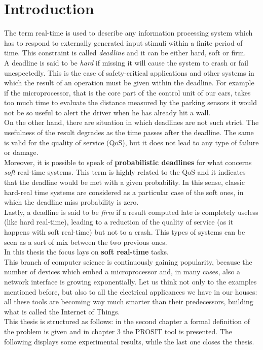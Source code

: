 \chapter{Introduction}\label{chp:introduction}


The term real-time is used to describe any information processing system which has to respond to externally generated input stimuli within a finite period of time. This constraint is called \emph{deadline} and it can be either hard, soft or firm.\\
A deadline is said to be \emph{hard} if missing it will cause the system to crash or fail unespectedly. This is the case of safety-critical applications and other systems in which the result of an operation must be given within the deadline. For example if the microprocessor, that is the core part of the control unit of our cars, takes too much time to evaluate the distance measured by the parking sensors it would not be so useful to alert the driver when he has already hit a wall.\\
On the other hand, there are situation in which deadlines are not such strict. The usefulness of the result degrades as the time passes after the deadline. The same is valid for the quality of service (QoS), but it does not lead to any type of failure or damage.\\
Moreover, it is possible to speak of \textbf{probabilistic deadlines} for what concerns \emph{soft} real-time systems. This term is highly related to the QoS and it indicates that the deadline would be met with a given probability. In this sense, classic hard-real time systems are considered as a particular case of the soft ones, in which the deadline miss probability is zero.\\ 
Lastly, a deadline is said to be \emph{firm} if a result computed late is completely useless (like hard real-time), leading to a reduction of the quality of service (as it happens with soft real-time) but not to a crash. This types of systems can be seen as a sort of mix between the two previous ones.\\
In this thesis the focus lays on \textbf{soft real-time} tasks.\\
This branch of computer science is continuously gaining popularity, because the number of devices which embed a microprocessor and, in many cases, also a network interface is growing exponentially. Let us think not only to the examples mentioned before, but also to all the electrical applicances we have in our houses: all these tools are becoming way much smarter than their predecessors, building what is called the Internet of Things.\\
This thesis is structured as follows: in the second chapter a formal definition of the problem is given and in chapter 3 the PROSIT tool is presented. The following displays some experimental results, while the last one closes the thesis.      